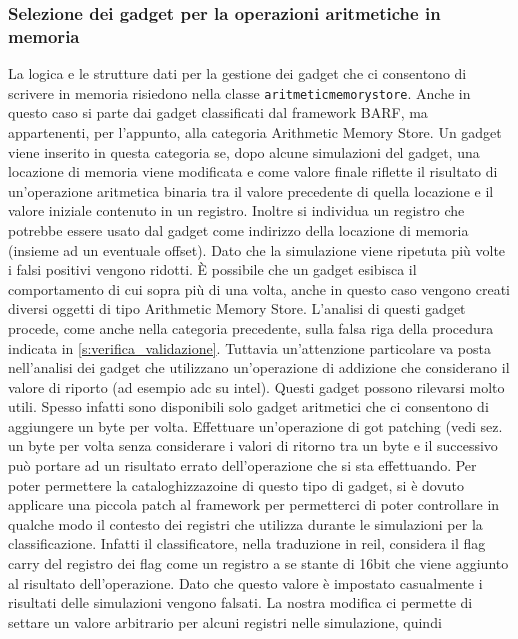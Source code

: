 \subsubsection{Selezione dei gadget per la operazioni aritmetiche in
  memoria}

La logica e le strutture dati per la gestione dei gadget che ci
consentono di scrivere in memoria risiedono nella classe
\lstinline{aritmeticmemorystore}. Anche in questo caso si parte dai
gadget classificati dal framework BARF, ma appartenenti, per
l'appunto, alla categoria Arithmetic Memory Store. Un gadget viene
inserito in questa categoria se, dopo alcune simulazioni del gadget,
una locazione di memoria viene modificata e come valore finale
riflette il risultato di un'operazione aritmetica binaria tra il
valore precedente di quella locazione e il valore iniziale contenuto
in un registro. Inoltre si individua un registro che potrebbe essere
usato dal gadget come indirizzo della locazione di memoria (insieme ad
un eventuale offset). Dato che la simulazione viene ripetuta più volte
i falsi positivi vengono ridotti. È possibile che un gadget esibisca
il comportamento di cui sopra più di una volta, anche in questo caso
vengono creati diversi oggetti di tipo Arithmetic Memory
Store. L'analisi di questi gadget procede, come anche nella categoria
precedente, sulla falsa riga della procedura indicata in
\ref{s:verifica_validazione}. Tuttavia un'attenzione particolare va
posta nell'analisi dei gadget che utilizzano un'operazione di
addizione che considerano il valore di riporto (ad esempio adc su
intel). Questi gadget possono rilevarsi molto utili. Spesso infatti
sono disponibili solo gadget aritmetici che ci consentono di
aggiungere un byte per volta. Effettuare un'operazione di got patching
(vedi sez.  un byte per volta senza considerare
i valori di ritorno tra un byte e il successivo può portare ad un
risultato errato dell'operazione che si sta effettuando. Per poter
permettere la cataloghizzazoine di questo tipo di gadget, si è dovuto
applicare una piccola patch al framework per permetterci di poter
controllare in qualche modo il contesto dei registri che utilizza
durante le simulazioni per la classificazione. Infatti il
classificatore, nella traduzione in reil, considera il flag carry del
registro dei flag come un registro a se stante di 16bit che viene
aggiunto al risultato dell'operazione. Dato che questo valore è
impostato casualmente i risultati delle simulazioni vengono
falsati. La nostra modifica ci permette di settare un valore
arbitrario per alcuni registri nelle simulazione, quindi

